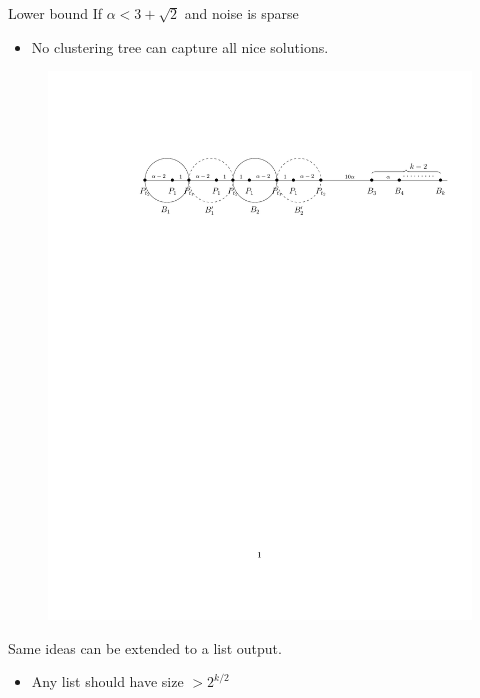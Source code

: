 \documentclass{beamer}
\begin{document}
\begin{frame}{Lower bound}
	If $\alpha < 3 + \sqrt{2}$ and noise is sparse
	\begin{itemize}
		\item No clustering tree can capture all nice solutions.
	\end{itemize}
	
	\vspace{20pt}\begin{figure}[!t]
	  \begin{center}
	    \includegraphics[trim={47mm 205mm 12mm 44mm},clip,width=\textwidth]{figures/clusteringNoise/lbdFig2.pdf}
	  \end{center}
	\end{figure}
	\vspace{20pt}Same ideas can be extended to a list output.\\
	\begin{itemize}
		\item Any list should have size $> 2^{k/2}$
	\end{itemize}
\end{frame}
\end{document}
